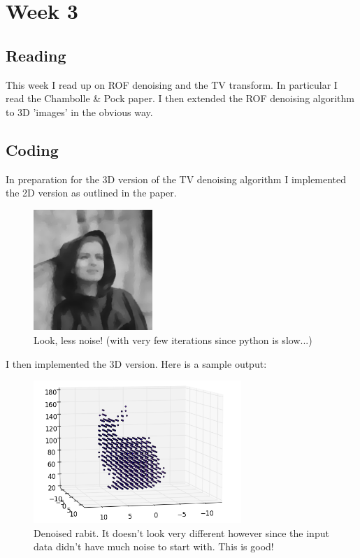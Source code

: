 \documentclass[a4paper]{article}
\begin{document}
\section{Week 3}
\subsection{Reading}
This week I read up on ROF denoising and the TV transform. In particular I read the Chambolle \& Pock paper.
I then extended the ROF denoising algorithm to 3D 'images' in the obvious way.

\subsection{Coding}
In preparation for the 3D version of the TV denoising algorithm I implemented the 2D version as outlined in the paper.

\begin{figure}[H]
  \centering
    \includegraphics[width=0.4\textwidth]{figures/denoised.png}
    \caption{Look, less noise! (with very few iterations since python is slow...)}
  \label{fig:f2}
\end{figure}

I then implemented the 3D version. Here is a sample output:

\begin{figure}[H]
  \centering
    \includegraphics[width=0.7\textwidth]{figures/smooth_rabit.png}
    \caption{Denoised rabit. It doesn't look very different however since the input data didn't have much noise to start with. This is good!}
  \label{fig:f2}
\end{figure}
\end{document}

